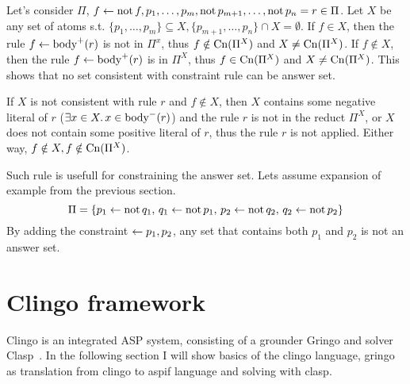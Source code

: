 \documentclass{fithesis}
\begin{document}

Let's consider $\Pi$, $f \leftarrow{} \mathrm{not}\, f, p_1, \dots, p_m,
\mathrm{not}\, p_{m+1}, \dots, \mathrm{not}\, p_n = r \in \Pi$. Let $X$ be
any set of atoms s.t. $\{p_1, \dots, p_m\}\subseteq X,
\{p_{m+1}, \dots, p_n\}\cap X = \emptyset$. If $f\in X$, then the rule
$f \leftarrow{} \mathrm{body}^+(r)$ is not in $\Pi^x$, thus $f\notin \mathrm{Cn}(\Pi^X)$
and $X \neq \mathrm{Cn}(\Pi^X)$. If $f\notin X$, then the rule
$f \leftarrow{} \mathrm{body}^+(r)$ is in $\Pi^X$, thus $f\in \mathrm{Cn}(\Pi^X)$
and $X\neq \mathrm{Cn}(\Pi^X)$. This shows that no set consistent with constraint
rule can be answer set.

If $X$ is not consistent with rule $r$ and $f\notin X$,
then $X$ contains some negative literal
of $r$ ($\exists x\in X.\, x\in \mathrm{body}^-(r)$) and the rule $r$ is not in the
reduct $\Pi^X$, or $X$ does not contain some positive literal of $r$, thus the
rule $r$ is not applied. Either way, $f\notin X, f\notin \mathrm{Cn}(\Pi^X)$.

Such rule is usefull for constraining the answer set. Lets assume expansion
of example from the previous section.
\begin{equation*}
    \Pi = \{
        p_1 \leftarrow{} \mathrm{not}\, q_1,\, q_1 \leftarrow{} \mathrm{not}\, p_1,\,
        p_2 \leftarrow{} \mathrm{not}\, q_2,\, q_2 \leftarrow{} \mathrm{not}\, p_2
    \}
\end{equation*}
By adding the constraint $\leftarrow{} p_1, p_2$, any set that contains both
$p_1$ and $p_2$ is not an answer set.

\section{Clingo framework}

Clingo is an integrated ASP system, consisting of a grounder Gringo and solver
Clasp~\cite{aspEasy2016}. In the following section I will show basics of the
clingo language, gringo as translation from clingo to aspif language and
solving with clasp.
\end{document}
